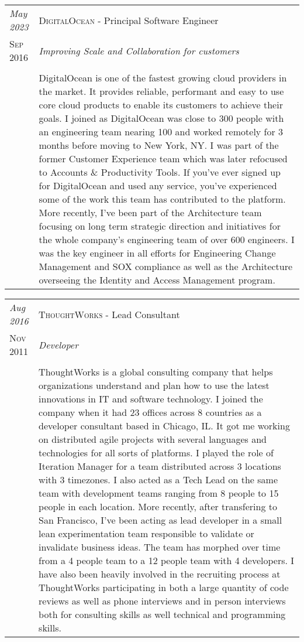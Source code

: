 \documentclass[letter,10pt]{article}
\begin{document}
\begin{tabular}{p{2.5cm}|p{13.5cm}}
  \emph{May 2023} & \textsc{DigitalOcean} - Principal Software Engineer\\
  \textsc{Sep 2016}& \emph{Improving Scale and Collaboration for customers}\\
  &\\
  &DigitalOcean is one of the fastest growing cloud providers in the market. It provides reliable, performant and easy to use core cloud products to enable its customers to achieve their goals. I joined as DigitalOcean was close to 300 people with an engineering team nearing 100 and worked remotely for 3 months before moving to New York, NY. I was part of the former Customer Experience team which was later refocused to Accounts \& Productivity Tools. If you've ever signed up for DigitalOcean and used any service, you've experienced some of the work this team has contributed to the platform. More recently, I've been part of the Architecture team focusing on long term strategic direction and initiatives for the whole company's engineering team of over 600 engineers. I was the key engineer in all efforts for Engineering Change Management and SOX compliance as well as the Architecture overseeing the Identity and Access Management program.
\end{tabular}


\begin{tabular}{p{2.5cm}|p{13.5cm}}
  \emph{Aug 2016} & \textsc{ThoughtWorks} - Lead Consultant\\
  \textsc{Nov 2011}& \emph{Developer}\\
  &\\
  &ThoughtWorks is a global consulting company that helps organizations understand and plan how to use the latest innovations in IT and software technology. I joined the company when it had 23 offices across 8 countries as a developer consultant based in Chicago, IL. It got me working on distributed agile projects with several languages and technologies for all sorts of platforms. I played the role of Iteration Manager for a team distributed across 3 locations with 3 timezones. I also acted as a Tech Lead on the same team with development teams ranging from 8 people to 15 people in each location. More recently, after transfering to San Francisco, I've been acting as lead developer in a small lean experimentation team responsible to validate or invalidate business ideas. The team has morphed over time from a 4 people team to a 12 people team with 4 developers. I have also been heavily involved in the recruiting process at ThoughtWorks participating in both a large quantity of code reviews as well as phone interviews and in person interviews both for consulting skills as well technical and programming skills.
\end{tabular}
\end{document}
